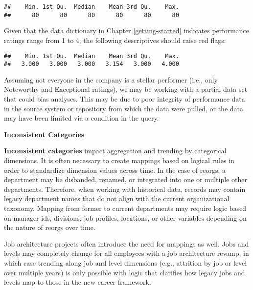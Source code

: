 \documentclass[
]{book}
\newenvironment{Shaded}{\begin{snugshade}}{\end{snugshade}}
\newcommand{\CommentTok}[1]{\textcolor[rgb]{0.56,0.35,0.01}{\textit{#1}}}
\newcommand{\FunctionTok}[1]{\textcolor[rgb]{0.00,0.00,0.00}{#1}}
\newcommand{\NormalTok}[1]{#1}
\newcommand{\SpecialCharTok}[1]{\textcolor[rgb]{0.00,0.00,0.00}{#1}}
\begin{document}
\begin{verbatim}
##    Min. 1st Qu.  Median    Mean 3rd Qu.    Max. 
##      80      80      80      80      80      80
\end{verbatim}

Given that the data dictionary in Chapter \ref{getting-started} indicates performance ratings range from 1 to 4, the following descriptives should raise red flags:

\begin{Shaded}
\end{Shaded}

\begin{verbatim}
##    Min. 1st Qu.  Median    Mean 3rd Qu.    Max. 
##   3.000   3.000   3.000   3.154   3.000   4.000
\end{verbatim}

Assuming not everyone in the company is a stellar performer (i.e., only Noteworthy and Exceptional ratings), we may be working with a partial data set that could bias analyses. This may be due to poor integrity of performance data in the source system or repository from which the data were pulled, or the data may have been limited via a condition in the query.

\textbf{Inconsistent Categories}

\textbf{Inconsistent categories} impact aggregation and trending by categorical dimensions. It is often necessary to create mappings based on logical rules in order to standardize dimension values across time. In the case of reorgs, a department may be disbanded, renamed, or integrated into one or multiple other departments. Therefore, when working with historical data, records may contain legacy department names that do not align with the current organizational taxonomy. Mapping from former to current departments may require logic based on manager ids, divisions, job profiles, locations, or other variables depending on the nature of reorgs over time.

Job architecture projects often introduce the need for mappings as well. Jobs and levels may completely change for all employees with a job architecture revamp, in which case trending along job and level dimensions (e.g., attrition by job or level over multiple years) is only possible with logic that clarifies how legacy jobs and levels map to those in the new career framework.
\end{document}
